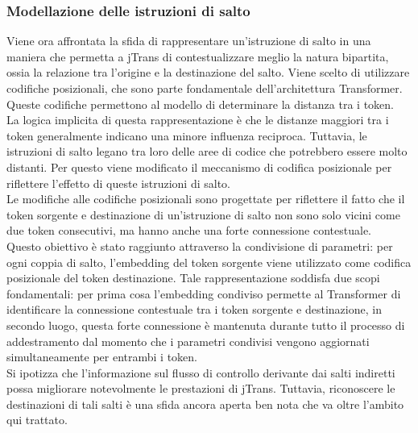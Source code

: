 \documentclass[12pt,a4paper,openright,twoside]{report}
\begin{document}
\subsubsection{Modellazione delle istruzioni di salto}
Viene ora affrontata la sfida di rappresentare un'istruzione di salto in una maniera che permetta a jTrans di contestualizzare meglio la natura bipartita, ossia la relazione tra l'origine e la destinazione del salto. Viene scelto di utilizzare codifiche posizionali, che sono parte fondamentale dell'architettura Transformer. Queste codifiche permettono al modello di determinare la distanza tra i token.\\
La logica implicita di questa rappresentazione è che le distanze maggiori tra i token generalmente indicano una minore influenza reciproca. Tuttavia, le istruzioni di salto legano tra loro delle aree di codice che potrebbero essere molto distanti. Per questo viene modificato il meccanismo di codifica posizionale per riflettere l'effetto di queste istruzioni di salto.\\
Le modifiche alle codifiche posizionali sono progettate per riflettere il fatto che il token sorgente e destinazione di un'istruzione di salto non sono solo vicini come due token consecutivi, ma hanno anche una forte connessione contestuale.\\ Questo obiettivo è stato raggiunto attraverso la condivisione di parametri: per ogni coppia di salto, l'embedding del token sorgente viene utilizzato come codifica posizionale del token destinazione. Tale rappresentazione soddisfa due scopi fondamentali: per prima cosa l'embedding condiviso permette al Transformer di identificare la connessione contestuale tra i token sorgente e destinazione, in secondo luogo, questa forte connessione è mantenuta durante tutto il processo di addestramento dal momento che i parametri condivisi vengono aggiornati simultaneamente per entrambi i token.\\
Si ipotizza che l'informazione sul flusso di controllo derivante dai salti indiretti possa migliorare notevolmente le prestazioni di jTrans. Tuttavia, riconoscere le destinazioni di tali salti è una sfida ancora aperta ben nota che va oltre l'ambito qui trattato.
\end{document}
